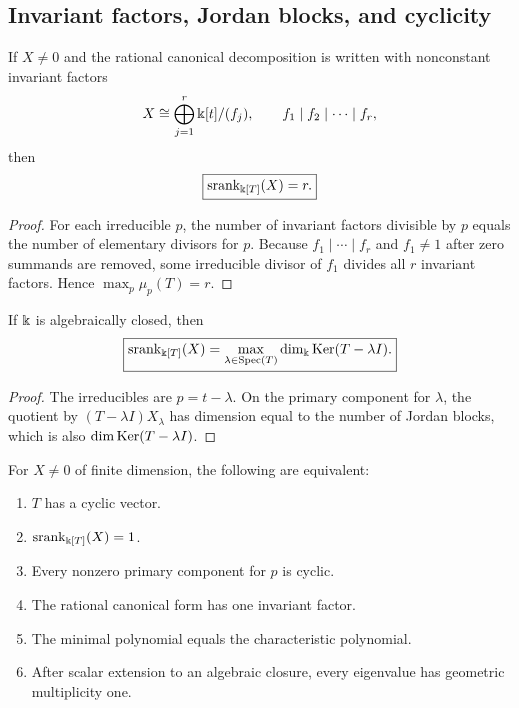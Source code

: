\subsection{Invariant factors, Jordan blocks, and cyclicity}
\begin{corollary}
\label{cor:invariant-factor-count}
If $X\neq0$ and the rational canonical decomposition is written with nonconstant invariant factors
\[
X\cong\bigoplus_{j=1}^{r}\Bbbk[t]/(f_j),
\qquad
f_1\mid f_2\mid\cdots\mid f_r,
\]
then
\[
\boxed{\operatorname{srank}_{\Bbbk[T]}(X)=r.}
\]
\end{corollary}

\begin{proof}
For each irreducible $p$, the number of invariant factors divisible by $p$ equals the number of elementary divisors for $p$.  Because $f_1\mid\cdots\mid f_r$ and $f_1\neq1$ after zero summands are removed, some irreducible divisor of $f_1$ divides all $r$ invariant factors.  Hence $\max_p\mu_p(T)=r$.
\end{proof}

\begin{corollary}
\label{cor:geometric-multiplicity}
If $\Bbbk$ is algebraically closed, then
\[
\boxed{
\operatorname{srank}_{\Bbbk[T]}(X)
=
\max_{\lambda\in\operatorname{Spec}(T)}
\dim_{\Bbbk}\operatorname{Ker}(T-\lambda I).
}
\]
\end{corollary}

\begin{proof}
The irreducibles are $p=t-\lambda$.  On the primary component for $\lambda$, the quotient by $(T-\lambda I)X_\lambda$ has dimension equal to the number of Jordan blocks, which is also $\dim\operatorname{Ker}(T-\lambda I)$.
\end{proof}

\begin{corollary}
\label{cor:cyclic-matrix}
For $X\ne0$ of finite dimension, the following are equivalent:
\begin{enumerate}[label=(\roman*)]
\item $T$ has a cyclic vector.
\item $\operatorname{srank}_{\Bbbk[T]}(X)=1$.
\item Every nonzero primary component for $p$ is cyclic.
\item The rational canonical form has one invariant factor.
\item The minimal polynomial equals the characteristic polynomial.
\item After scalar extension to an algebraic closure, every eigenvalue has geometric multiplicity one.
\end{enumerate}
\end{corollary}

